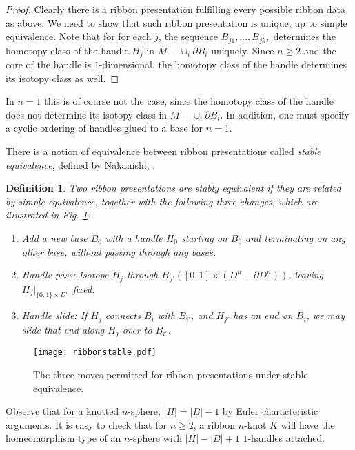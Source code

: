 \documentclass{amsart}
\newtheorem{definition}[theorem]{Definition}
\newcommand{\bpr}{\begin{proof}}
\newcommand{\epr}{\end{proof}}
\newcommand{\p}{\partial}
\begin{document}
\bpr Clearly there is a ribbon presentation fulfilling every possible ribbon data as above.
We need to show that such ribbon presentation is unique, up to simple equivalence. Note that for for each $j$, the sequence $B_{j1},...,B_{jk},$ determines the homotopy class of the handle $H_j$ in $M-\cup_i \p B_i$ uniquely. Since $n\geq 2$ and the core of the handle is $1$-dimensional, the homotopy class of the handle determines its isotopy class as well.
\epr

In $n=1$ this is of course not the case, since the homotopy class of the handle does not determine its isotopy class in $M-\cup_i \p B_i$. In addition, one must specify a cyclic ordering  of handles glued to a base for $n=1$.

There is a notion of equivalence between ribbon presentations called \emph{stable equivalence}, defined by Nakanishi, \cite{Naka}. 

\begin{definition}
Two ribbon presentations are \emph{stably equivalent} if they are related by simple equivalence, together with the following three changes, which are illustrated in Fig. \ref{ribbonstable}:

\begin{enumerate}
	\item Add a new base $B_{0}$ with a handle $H_{0}$ starting on $B_{0}$ and terminating on any other base, without passing through any bases.
	\item \emph{Handle pass}: Isotope $H_{j}$ through $H_{j'}([0,1]\times (D^n-\partial D^n))$, leaving $H_j|_{\{ 0,1\}\times D^n}$ fixed.
	\item \emph{Handle slide}: If $H_{j}$ connects $B_{i}$ with $B_{i'}$, and $H_{j'}$ has an end on $B_{i}$, we may slide that end along $H_{j}$ over to $B_{i'}$.
\end{enumerate}
\end{definition}

\begin{figure}
		\centering
			\texttt{[image: ribbonstable.pdf]}
		\caption{The three moves permitted for ribbon presentations under stable equivalence.}
		\label{ribbonstable}
\end{figure}

Observe that for a knotted $n$-sphere, $|H|=|B|-1$ by Euler characteristic arguments. It is easy to check that for $n\geq 2$, a ribbon $n$-knot $K$ will have the homeomorphism type of an $n$-sphere with $|H|-|B|+1$ $1$-handles attached.
\end{document}
